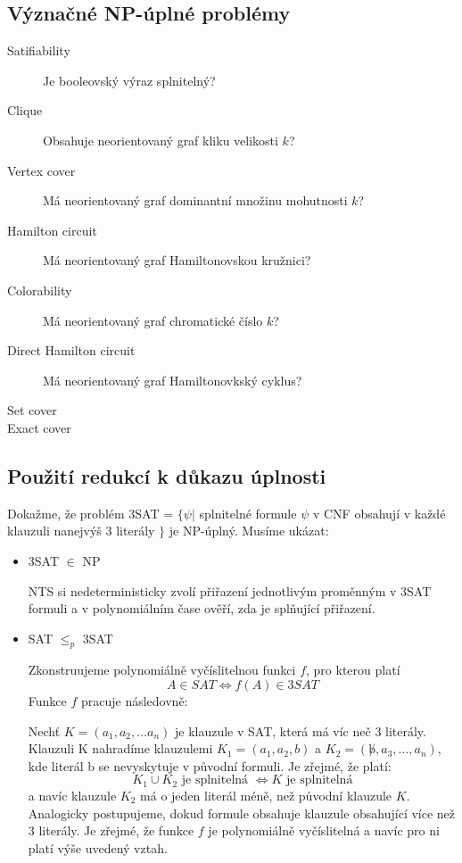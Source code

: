 \documentclass[a4paper, 11pt]{report}
\begin{document}
\subsection{Význačné NP-úplné problémy}
\begin{description}
	\item[Satifiability] Je booleovský výraz splnitelný?
	\item[Clique] Obsahuje neorientovaný graf kliku velikosti $k$?
	\item[Vertex cover] Má neorientovaný graf dominantní množinu mohutnosti $k$?
	\item[Hamilton circuit] Má neorientovaný graf Hamiltonovskou kružnici?
	\item[Colorability] Má neorientovaný graf chromatické číslo $k$?
	\item[Direct Hamilton circuit] Má neorientovaný graf Hamiltonovkský cyklus?
	\item[Set cover]
	\item[Exact cover] %
\end{description}

\subsection{Použití redukcí k důkazu úplnosti}

Dokažme, že problém 3SAT = $\{\psi | $ splnitelné formule $\psi$ v CNF obsahují v každé klauzuli nanejvýš 3 literály $\}$ je NP-úplný.
Musíme ukázat:
\begin{itemize}
	\item 3SAT $\in$ NP
	
	NTS si nedeterministicky zvolí přiřazení jednotlivým proměnným v 3SAT formuli a v polynomiálním čase ověří, zda je splňující přiřazení.
	
	\item SAT $\leq_p$ 3SAT
	
	Zkonstruujeme polynomiálně vyčíslitelnou funkci $f$, pro kterou platí
	$$A \in SAT \Leftrightarrow f(A) \in 3SAT$$
	Funkce $f$ pracuje následovně:
	
	Nechť $K = (a_1, a_2, \dots a_n)$ je klauzule v SAT, která má víc neč 3 literály. Klauzuli K nahradíme klauzulemi $K_1 = (a_1, a_2, b)$ a $K_2 = (\not b, a_3, \dots, a_n)$, kde literál b se nevyskytuje v původní formuli. Je zřejmé, že platí:
	$$K_1 \cup K_2 \text{ je splnitelná } \Leftrightarrow K \text{ je splnitelná}$$
	a navíc klauzule $K_2$ má o jeden literál méně, než původní klauzule $K$. Analogicky postupujeme, dokud formule obsahuje klauzule obsahující více než 3 literály. Je zřejmé, že funkce $f$ je polynomiálně vyčíslitelná a navíc pro ni platí výše uvedený vztah.
\end{itemize}
\end{document}
